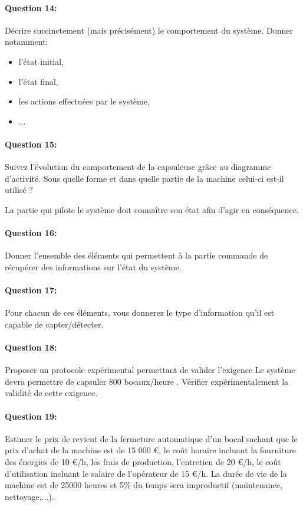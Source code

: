\paragraph{Question 14:} Décrire succinctement (mais précisément) le comportement du système. Donner notamment:
\begin{itemize}
 \item l'état initial,
 \item l'état final,
 \item les actions effectuées par le système,
 \item ...
\end{itemize}

\paragraph{Question 15:} Suivez l'évolution du comportement de la capsuleuse grâce au diagramme d'activité. Sous quelle forme et dans quelle partie de la machine celui-ci est-il utilisé ?


La partie qui pilote le système doit connaître son état afin d'agir en conséquence. 

\paragraph{Question 16:} Donner l'ensemble des éléments qui permettent à la partie commande de récupérer des informations sur l'état du système.

\paragraph{Question 17:} Pour chacun de ces éléments, vous donnerez le type d'information qu'il est capable de capter/détecter.

\paragraph{Question 18:} Proposer un protocole expérimental permettant de valider l'exigence \og Le système devra permettre de capsuler 800 bocaux/heure \fg. Vérifier expérimentalement la validité de cette exigence.

\paragraph{Question 19:} Estimer le prix de revient de la fermeture automatique d'un bocal sachant que le prix d'achat de la machine est de 15 000 \euro, le coût horaire incluant la fourniture des énergies de 10 \euro/h, les frais de production, l'entretien de 20 \euro/h, le coût d'utilisation incluant le salaire de l'opérateur de 15 \euro/h. La durée de vie de la machine est de 25000 heures et 5\% du temps sera improductif (maintenance, nettoyage,...).  

